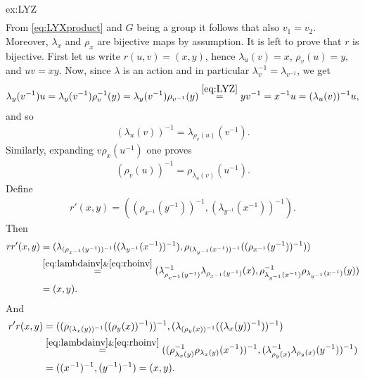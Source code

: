 \begin{sol}{ex:LYZ}
\begin{align*}
    \end{align*}
    From \eqref{eq:LYXproduct} and $G$ being a group it follows that also $v_1=v_2$.
    Moreover, $\lambda_x$ and $\rho_x$ are bijective maps by assumption. 
    It is left to prove that $r$ is bijective.
    First let us write $r(u,v)=(x,y)$, hence $\lambda_u(v)=x$, $\rho_v(u)=y$, and $uv=xy$. Now, since $\lambda$ is an action and in particular $\lambda^{-1}_v=\lambda_{v^{-1}}$, we get 
    \begin{align*}
        \lambda_y(v^{-1})u = \lambda_y(v^{-1})\rho^{-1}_v(y) = \lambda_y(v^{-1})\rho_{v^{-1}}(y) \overset{\eqref{eq:LYZ}}{=} yv^{-1} = x^{-1}u = (\lambda_u(v))^{-1}u,
    \end{align*}
    and so 
    \begin{align}\label{eq:lambdainv}
        (\lambda_u(v))^{-1}=\lambda_{\rho_v(u)}(v^{-1}).
    \end{align}
    Similarly, expanding $v\rho_x(u^{-1})$ one proves
    \begin{align}\label{eq:rhoinv}
        (\rho_v(u))^{-1}=\rho_{\lambda_u(v)}(u^{-1}).
    \end{align}
    Define
    \begin{align*}
        r'(x,y)=((\rho_{x^{-1}}(y^{-1}))^{-1},(\lambda_{y^{-1}}(x^{-1}))^{-1}).
    \end{align*}
    Then
    \begin{align*}
        rr'(x,y) &= (\lambda_{(\rho_{x^{-1}}(y^{-1}))^{-1}}((\lambda_{y^{-1}}(x^{-1}))^{-1}), \rho_{(\lambda_{y^{-1}}(x^{-1}))^{-1}}((\rho_{x^{-1}}(y^{-1}))^{-1}))\\
        &\overset{\eqref{eq:lambdainv}\&\eqref{eq:rhoinv}}{=}(\lambda^{-1}_{\rho_{x^{-1}}(y^{-1})}\lambda_{\rho_{x^{-1}}(y^{-1})}(x),\rho^{-1}_{\lambda_{y^{-1}}(x^{-1})}\rho_{\lambda_{y^{-1}}(x^{-1})}(y)) \\
        &=(x,y).
    \end{align*}
    And
    \begin{align*}
        r'r(x,y) &= ((\rho_{(\lambda_x(y))^{-1}}((\rho_y(x))^{-1}))^{-1},(\lambda_{(\rho_y(x))^{-1}}((\lambda_x(y))^{-1}))^{-1})\\
        &\overset{\eqref{eq:lambdainv}\&\eqref{eq:rhoinv}}{=} ( (\rho^{-1}_{\lambda_x(y)}\rho_{\lambda_x(y)}(x^{-1}))^{-1}, (\lambda^{-1}_{\rho_y(x)}\lambda_{\rho_y(x)}(y^{-1}))^{-1})\\
        &=((x^{-1})^{-1},(y^{-1})^{-1}) = (x,y).
    \end{align*}
\end{sol}

